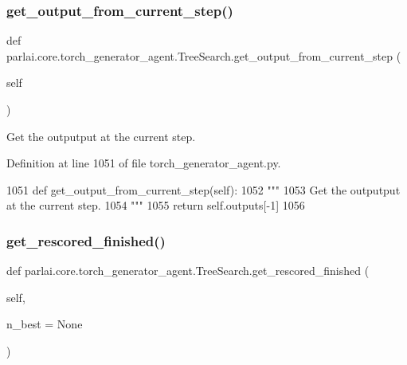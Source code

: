 \subsubsection{\texorpdfstring{get\+\_\+output\+\_\+from\+\_\+current\+\_\+step()}{get\_output\_from\_current\_step()}}
{\footnotesize\ttfamily def parlai.\+core.\+torch\+\_\+generator\+\_\+agent.\+Tree\+Search.\+get\+\_\+output\+\_\+from\+\_\+current\+\_\+step (\begin{DoxyParamCaption}\item[{}]{self }\end{DoxyParamCaption})}

\begin{DoxyVerb}Get the outputput at the current step.
\end{DoxyVerb}
 

Definition at line 1051 of file torch\+\_\+generator\+\_\+agent.\+py.


\begin{DoxyCode}
1051     \textcolor{keyword}{def }get\_output\_from\_current\_step(self):
1052         \textcolor{stringliteral}{"""}
1053 \textcolor{stringliteral}{        Get the outputput at the current step.}
1054 \textcolor{stringliteral}{        """}
1055         \textcolor{keywordflow}{return} self.outputs[-1]
1056 
\end{DoxyCode}
\mbox{\label{classparlai_1_1core_1_1torch__generator__agent_1_1TreeSearch_a4b70f85eec7d81b3a0e1afaea5b09332}} 
\subsubsection{\texorpdfstring{get\+\_\+rescored\+\_\+finished()}{get\_rescored\_finished()}}
{\footnotesize\ttfamily def parlai.\+core.\+torch\+\_\+generator\+\_\+agent.\+Tree\+Search.\+get\+\_\+rescored\+\_\+finished (\begin{DoxyParamCaption}\item[{}]{self,  }\item[{}]{n\+\_\+best = {\ttfamily None} }\end{DoxyParamCaption})}

